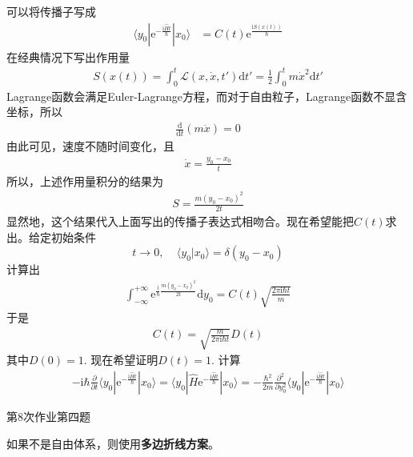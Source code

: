         可以将传播子写成
        \begin{align*}
            \langle y_0 | \mathrm{e}^{-\frac {\mathrm{i}\hat{H}t}{\hbar}} |x_0 \rangle &= C(t) \mathrm{e}^{\frac {\mathrm{i}S(x(t))}{\hbar}}
        \end{align*}
        在经典情况下写出作用量
        \begin{align*}
            S(x(t)) = \int_0^t \mathcal{L}(x,\dot{x},t') \mathrm{d}t' = \frac 12 \int_0^t m\dot{x}^2 \mathrm{d}t'
        \end{align*}
        Lagrange函数会满足Euler-Lagrange方程，而对于自由粒子，Lagrange函数不显含坐标，所以
        \begin{align*}
            \frac {\mathrm{d}}{\mathrm{d}t} (m \dot x) = 0
        \end{align*}
        由此可见，速度不随时间变化，且
        \begin{align*}
            \dot{x} = \frac {y_0-x_0}t
        \end{align*}
        所以，上述作用量积分的结果为
        \begin{align*}
            S = \frac {m(y_0 - x_0)^2}{2t}
        \end{align*}
        显然地，这个结果代入上面写出的传播子表达式相吻合。现在希望能把$C(t)$求出。给定初始条件
        \begin{equation*}
            t \to 0,~~~~~\langle y_0|x_0\rangle = \delta(y_0-x_0)
        \end{equation*}
        计算出
        \begin{align*}
            \int_{-\infty}^{+\infty} \mathrm{e}^{\frac {\mathrm{i}}{\hbar} \frac {m(y_0 - x_0)^2}{2t}}\mathrm{d}y_0 = C(t) \sqrt{\frac {2\pi\mathrm{i}\hbar t}m}
        \end{align*}
        于是 
        \begin{align*}
            C(t) = \sqrt{\frac m{2\pi\mathrm{i}\hbar t}} D(t)
        \end{align*}
        其中$D(0) = 1$. 现在希望证明$D(t) = 1$.
        计算
        \begin{align*}
            -\mathrm{i}\hbar \frac {\partial}{\partial t} \langle y_0 | \mathrm{e}^{-\frac {\mathrm{i}\hat{H}t}{\hbar}} |x_0 \rangle =  \langle y_0 | \hat{H} \mathrm{e}^{-\frac {\mathrm{i}\hat{H}t}{\hbar}} |x_0 \rangle
            = -\frac {\hbar^2}{2m} \frac {\partial^2}{\partial y_0^2} \langle y_0 | \mathrm{e}^{-\frac {\mathrm{i}\hat{H}t}{\hbar}} |x_0 \rangle
        \end{align*}
        \begin{asg}
            第8次作业第四题
        \end{asg}
        如果不是自由体系，则使用\textbf{多边折线方案}。
